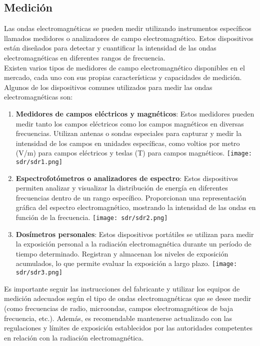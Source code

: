 \documentclass[
	12pt, %
	fleqn, %
	a4paper, %
	oneside, %
]{LegrandOrangeBook}
\begin{document}
\subsection{Medición}
Las ondas electromagnéticas se pueden medir utilizando instrumentos específicos llamados medidores o analizadores de campo electromagnético. Estos dispositivos están diseñados para detectar y cuantificar la intensidad de las ondas electromagnéticas en diferentes rangos de frecuencia.\\
Existen varios tipos de medidores de campo electromagnético disponibles en el mercado, cada uno con sus propias características y capacidades de medición. Algunos de los dispositivos comunes utilizados para medir las ondas electromagnéticas son:
\begin{enumerate}
\item \textbf{Medidores de campos eléctricos y magnéticos}: Estos medidores pueden medir tanto los campos eléctricos como los campos magnéticos en diversas frecuencias. Utilizan antenas o sondas especiales para capturar y medir la intensidad de los campos en unidades específicas, como voltios por metro (V/m) para campos eléctricos y teslas (T) para campos magnéticos.
\texttt{[image: sdr/sdr1.png]}
\item \textbf{Espectrofotómetros o analizadores de espectro}: Estos dispositivos permiten analizar y visualizar la distribución de energía en diferentes frecuencias dentro de un rango específico. Proporcionan una representación gráfica del espectro electromagnético, mostrando la intensidad de las ondas en función de la frecuencia.
\texttt{[image: sdr/sdr2.png]}
\item \textbf{Dosímetros personales}: Estos dispositivos portátiles se utilizan para medir la exposición personal a la radiación electromagnética durante un período de tiempo determinado. Registran y almacenan los niveles de exposición acumulados, lo que permite evaluar la exposición a largo plazo.
\texttt{[image: sdr/sdr3.png]}
\end{enumerate}
Es importante seguir las instrucciones del fabricante y utilizar los equipos de medición adecuados según el tipo de ondas electromagnéticas que se desee medir (como frecuencias de radio, microondas, campos electromagnéticos de baja frecuencia, etc.). Además, es recomendable mantenerse actualizado con las regulaciones y límites de exposición establecidos por las autoridades competentes en relación con la radiación electromagnética.
\end{document}
